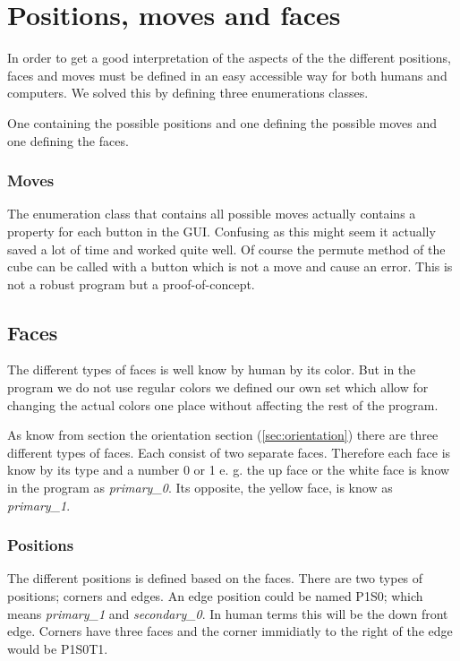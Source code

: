 \section{Positions, moves and faces}
In order to get a good interpretation of the aspects of the \cube{} the different positions, faces and moves must be defined in an easy accessible way for both humans and computers. We solved this by defining three enumerations classes. 

One containing the possible positions and one defining the possible moves and one defining the faces.

\subsubsection{Moves}
The enumeration class that contains all possible moves actually contains a property for each button in the GUI. Confusing as this might seem it actually saved a lot of time and worked quite well. Of course the permute method of the cube can be called with a button which is not a move and cause an error. This is not a robust program but a proof-of-concept. 

\subsection{Faces}
The different types of faces is well know by human by its color. But in the program we do not use regular colors we defined our own set which allow for changing the actual colors one place without affecting the rest of the program. 

As know from section the orientation section (\ref{sec:orientation}) there are three different types of faces. Each consist of two separate faces. Therefore each face is know by its type and a number 0 or 1 e. g. the up face or the white face is know in the program as \textit{primary\_0}. Its opposite, the yellow face, is know as \textit{primary\_1}. 

\subsubsection{Positions}
The different positions is defined based on the faces. There are two types of positions; corners and edges. An edge position could be named P1S0; which means \textit{primary\_1} and \textit{secondary\_0}. In human terms this will be the down front edge. Corners have three faces and the corner immidiatly to the right of the edge would be P1S0T1.  
